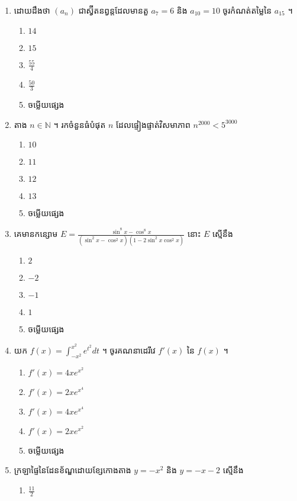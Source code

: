\documentclass[12pt, a4paper]{article}
\begin{document}
\begin{enumerate}[m]
	\item ដោយដឹងថា $\left(a_n\right)$ ជាស្វ៊ីតនព្វន្តដែលមានតួ $a_7=6$ និង $a_{10}=10$ ចូរកំណត់តម្លៃនៃ $a_{15}$ ។
	\begin{enumerate}[k,5]
		\item $14$
		\item $15$
		\item $\frac{55}{4}$
		\item $\frac{50}{3}$
		\item ចម្លើយផ្សេង
	\end{enumerate}
	{\color{blue}\hrulefill}
	\item តាង $n\in \mathbb{N}$ ។ រកចំនួនធំបំផុត $n$ ដែលផ្ទៀងផ្ទាត់វិសមាភាព $n^{2000}<5^{3000}$
	\begin{enumerate}[k,5]
		\item $10$
		\item $11$
		\item $12$
		\item $13$
		\item ចម្លើយផ្សេង
	\end{enumerate}
	{\color{blue}\hrulefill}
	\item គេមានកន្សោម $E=\frac{\sin^8x-\cos^8x}{\left(\sin^2x-\cos^2x\right)\left(1-2\sin^2x\cos^2x\right)}$ នោះ $E$ ស្មើនឹង
	\begin{enumerate}[k,5]
		\item $2$
		\item $-2$
		\item $-1$
		\item $1$
		\item ចម្លើយផ្សេង
	\end{enumerate}
	{\color{blue}\hrulefill}
	\item យក $f(x)=\int_{-x^2}^{x^2}e^{t^2}dt$ ។ ចូរគណនាដេរីវេ $f'(x)$ នៃ $f(x)$ ។
	\begin{enumerate}[k,5]
		\item $f'(x)=4xe^{x^2}$
		\item $f'(x)=2xe^{x^4}$
		\item $f'(x)=4xe^{x^4}$
		\item $f'(x)=2xe^{x^2}$
		\item ចម្លើយផ្សេង
	\end{enumerate}
	{\color{blue}\hrulefill}
	\item ក្រឡាផ្ទៃនៃដែនខ័ណ្ឌដោយខ្សែកោងតាង $y=-x^2$ និង $y=-x-2$ ស្មើនឹង 
	\begin{enumerate}[k,5]
		\item $\frac{11}{2}$

\end{enumerate}
\end{enumerate}
\end{document}
